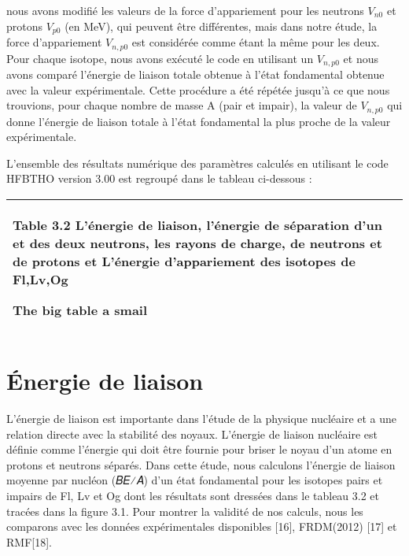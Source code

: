 nous avons modifié les valeurs de la force d'appariement pour les neutrons  $V_{n0}$ et protons  $V_{p0}$ (en MeV), qui peuvent être différentes, mais dans notre étude, la force d'appariement  $V_{n,p0}$  est considérée comme étant la même pour les deux. Pour chaque isotope, nous avons exécuté le code en utilisant un  $V_{n,p0}$  et  nous avons comparé l'énergie de liaison totale obtenue à l'état fondamental obtenue avec la valeur expérimentale. Cette procédure a été répétée jusqu'à ce que nous trouvions, pour chaque nombre de masse A (pair et impair), la valeur de  $V_{n,p0}$  qui donne l'énergie de liaison totale à l'état fondamental la plus proche de la valeur expérimentale.

 L’ensemble des résultats numérique des paramètres calculés en utilisant le code HFBTHO version 3.00  est regroupé dans le tableau ci-dessous :




\begin{flushleft}
\tablefirsthead{}
\tablehead{}
\tabletail{}
\tablelasttail{}
\begin{supertabular}{|m{5.78026in}|}
\hline
{\begin{french} \textbf{  Table 3.2 }L'énergie de liaison, l'énergie de séparation d’un et des deux neutrons, les rayons de charge, de neutrons et de protons et L’énergie d’appariement des isotopes de Fl,Lv,Og\end{french}}

{\bfseries  \textenglish{The big table a smail}}\\\hline
\end{supertabular}
\end{flushleft}
\section{ Énergie de liaison}

 L'énergie de liaison est importante dans l'étude de la physique nucléaire et a une relation directe avec la stabilité des noyaux. L'énergie de liaison nucléaire est définie comme l'énergie qui doit être fournie pour briser le noyau d'un atome en protons et neutrons séparés. Dans cette étude, nous calculons l'énergie de liaison moyenne par nucléon (𝐵𝐸⁄𝐴) d'un état fondamental pour les isotopes pairs et impairs de Fl, Lv et Og  dont les résultats sont dressées dans le tableau 3.2 et tracées dans la figure 3.1. Pour montrer la validité de nos calculs, nous les comparons avec les données expérimentales disponibles [16], FRDM(2012) [17] et RMF[18].

